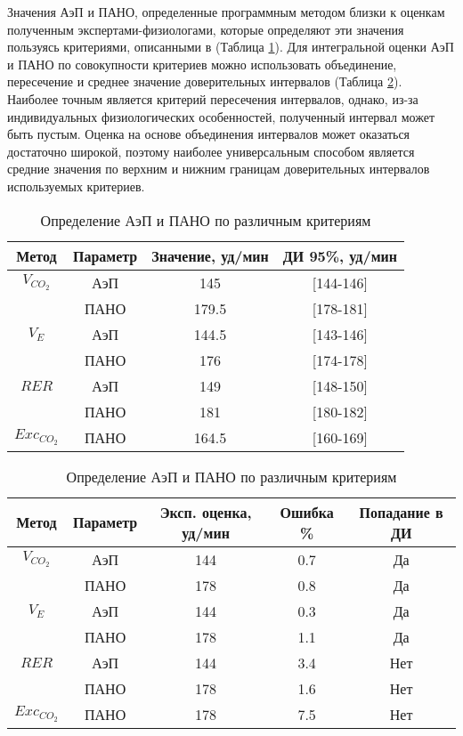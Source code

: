 Значения АэП и ПАНО, определенные программным методом близки к оценкам полученным экспертами-физиологами, которые определяют эти значения пользуясь критериями, описанными в \cite{volkov2013} (Таблица \ref{tabular:lt1}). Для интегральной оценки АэП и ПАНО по совокупности критериев можно использовать объединение, пересечение и среднее значение доверительных интервалов (Таблица \ref{tabular:lt2}). Наиболее точным является критерий пересечения интервалов, однако, из-за индивидуальных физиологических особенностей, полученный интервал может быть пустым. Оценка на основе объединения интервалов может оказаться достаточно широкой, поэтому наиболее универсальным способом является средние значения по верхним и нижним границам доверительных интервалов используемых критериев.  

\begin{table}[!ht]
\centering
\caption{Определение АэП и ПАНО по различным критериям}
\medskip
\label{tabular:lt1}
\begin{tabular}{|c|c|c|c|}
\hline
Метод & Параметр & Значение, уд/мин & ДИ 95\%, уд/мин \\
\hline
\(V_{CO_{2}}\) & АэП & 145 & [144-146] \\
\hline
 & ПАНО & 179.5 & [178-181] \\
\hline
\(V_{E}\) & АэП & 144.5 & [143-146] \\
\hline
 & ПАНО & 176 & [174-178] \\
\hline
\(RER\) & АэП & 149 & [148-150] \\
\hline
 & ПАНО & 181 & [180-182] \\
\hline
\(Exc_{CO_{2}}\) & ПАНО & 164.5 & [160-169] \\
\hline
\end{tabular}
\end{table}

\begin{table}[!ht]
\centering
\caption{Определение АэП и ПАНО по различным критериям}
\medskip
\label{tabular:lt2}
\begin{tabular}{|c|c|c|c|c|}
\hline
Метод & Параметр & Эксп. оценка, уд/мин & Ошибка \% & Попадание в ДИ \\
\hline
\(V_{CO_{2}}\) & АэП & 144 & 0.7 & Да \\
\hline
 & ПАНО & 178 & 0.8 & Да \\
\hline
\(V_{E}\) & АэП & 144 & 0.3 & Да \\
\hline
 & ПАНО &  178 & 1.1 & Да \\
\hline
\(RER\) & АэП & 144 & 3.4 & Нет \\
\hline
 & ПАНО & 178 & 1.6 & Нет \\
\hline
\(Exc_{CO_{2}}\) & ПАНО & 178 & 7.5 & Нет \\
\hline
\end{tabular}
\end{table}

